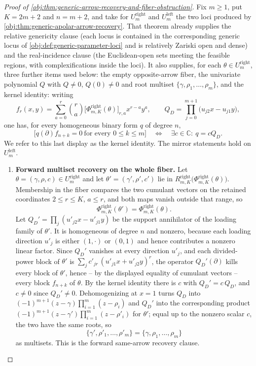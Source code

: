 \begin{proof}[Proof of \cref{obj:thm:generic-arrow-recovery-and-fiber-obstruction}]
Fix \(m\ge 1\), put \(K=2m+2\) and \(n=m+2\), and take for \(U^{\mathrm{right}}_m\) and \(U^{\mathrm{left}}_m\) the two loci produced by \cref{obj:thm:generic-apolar-arrow-recovery}.  That theorem already supplies the relative genericity clause (each locus is contained in the corresponding generic locus of \cref{obj:def:generic-parameter-loci} and is relatively Zariski open and dense) and the real-incidence clause (the Euclidean-open sets meeting the feasible regions, with complexifications inside the loci).  It also supplies, for each \(\theta\in U^{\mathrm{right}}_m\), three further items used below: the empty opposite-arrow fiber, the univariate polynomial \(Q\) with \(Q\ne 0\), \(Q(0)\ne0\) and root multiset \(\{\gamma,\rho_1,\ldots,\rho_m\}\), and the kernel identity: writing
\[
f_r(x,y)=\sum_{a=0}^{r}\binom{r}{a}\bigl[\Phi^{\mathrm{right}}_{m,K}(\theta)\bigr]_{r,a}x^{r-a}y^{a},
\qquad
Q_D=\prod_{j=0}^{m+1}\bigl(u_{j2}x-u_{j1}y\bigr),
\]
one has, for every homogeneous binary form \(q\) of degree \(n\),
\[
\bigl[q(\partial)f_{n+k}=0\ \text{for every }0\le k\le m\bigr]
\quad\Longleftrightarrow\quad
\exists c\in\mathbb C:\ q=cQ_D .
\]
We refer to this last display as the kernel identity.
The mirror statements hold on \(U^{\mathrm{left}}_m\).

\begin{enumerate}
\item \textbf{Forward multiset recovery on the whole fiber.}  Let \(\theta=(\gamma,\rho,c)\in U^{\mathrm{right}}_m\) and let \(\theta'=(\gamma',\rho',c')\) lie in \(R^{\mathrm{right}}_{m,K}\bigl(\Phi^{\mathrm{right}}_{m,K}(\theta)\bigr)\).  Membership in the fiber compares the two cumulant vectors on the retained coordinates \(2\le r\le K\), \(a\le r\), and both maps vanish outside that range, so
\[
\Phi^{\mathrm{right}}_{m,K}(\theta')=\Phi^{\mathrm{right}}_{m,K}(\theta).
\]
Let \(Q_D'=\prod_{j}(u'_{j2}x-u'_{j1}y)\) be the support annihilator of the loading family of \(\theta'\).  It is homogeneous of degree \(n\) and nonzero, because each loading direction \(u'_j\) is either \((1,\cdot)\) or \((0,1)\) and hence contributes a nonzero linear factor.  Since \(Q_D'\) vanishes at every direction \(u'_j\), and each divided-power block of \(\theta'\) is \(\sum_j c'_{jr}\,(u'_{j1}x+u'_{j2}y)^{r}\), the operator \(Q_D'(\partial)\) kills every block of \(\theta'\), hence -- by the displayed equality of cumulant vectors -- every block \(f_{n+k}\) of \(\theta\).  By the kernel identity there is \(c\) with \(Q_D'=c\,Q_D\), and \(c\ne0\) since \(Q_D'\ne0\).  Dehomogenizing at \(x=1\) turns \(Q_D\) into \((-1)^{m+1}(z-\gamma)\prod_{i=1}^{m}(z-\rho_i)\) and \(Q_D'\) into the corresponding product \((-1)^{m+1}(z-\gamma')\prod_{i=1}^{m}(z-\rho'_i)\) for \(\theta'\); equal up to the nonzero scalar \(c\), the two have the same roots, so
\[
\{\gamma',\rho'_1,\ldots,\rho'_m\}=\{\gamma,\rho_1,\ldots,\rho_m\}
\]
as multisets.  This is the forward same-arrow recovery clause.


\end{enumerate}
\end{proof}
